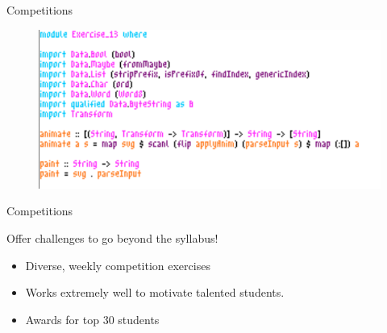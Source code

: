 \documentclass{beamer}
\begin{document}
\begin{frame}[fragile]{Competitions}
{\begin{figure}
\includegraphics[width=\linewidth]{assets/creativity2}
\end{figure}
}
\end{frame}

\begin{frame}[fragile]{Competitions}
\centerline{\Large{\alert{Offer challenges to go beyond the syllabus!}}}
\begin{itemize}
\item Diverse, weekly competition exercises
\item Works extremely well to motivate talented students.
\item<2-> Awards for top 30 students
\end{itemize}
\end{frame}
\end{document}
